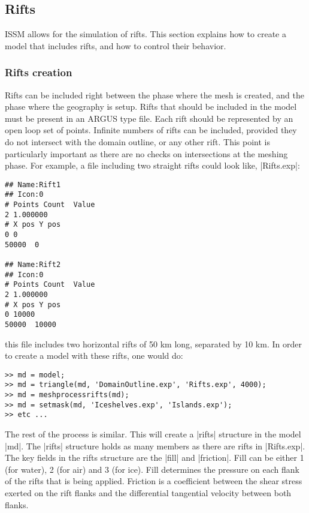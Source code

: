
\subsection{Rifts} \label{sec:using-issm-advanced-rifts}
ISSM allows for the simulation of rifts. This section explains how to create a model that includes rifts, and how to control their behavior.

\subsubsection{Rifts creation}
Rifts can be included right between the phase where the mesh is created, and the phase where the geography is setup. Rifts that should be included in the model must be present in an ARGUS type file. Each rift should be represented by an open loop set of points. Infinite numbers of rifts can be included, provided they do not intersect with the domain outline, or any other rift. This point is particularly important as there are no checks on intersections at the meshing phase. For example, a file including two straight rifts could look like, \lstinlinebg|Rifts.exp|:
\begin{lstlisting}
## Name:Rift1
## Icon:0
# Points Count  Value
2 1.000000
# X pos Y pos
0 0
50000  0

## Name:Rift2
## Icon:0
# Points Count  Value
2 1.000000
# X pos Y pos
0 10000
50000  10000
\end{lstlisting}
this file includes two horizontal rifts of 50 km long, separated by 10 km. In order to create a
model with these rifts, one would do:
\begin{lstlisting}
>> md = model;
>> md = triangle(md, 'DomainOutline.exp', 'Rifts.exp', 4000);
>> md = meshprocessrifts(md);
>> md = setmask(md, 'Iceshelves.exp', 'Islands.exp');
>> etc ...
\end{lstlisting}
The rest of the process is similar. This will create a \lstinlinebg|rifts| structure in the model \lstinlinebg|md|. The \lstinlinebg|rifts| structure holds as many members as there are rifts in \lstinlinebg|Rifts.exp|. The key fields in the rifts structure are the \lstinlinebg|fill| and \lstinlinebg|friction|. Fill can be either 1 (for water), 2 (for air) and 3 (for ice). Fill determines the pressure on each flank of the rifts that is being applied. Friction is a coefficient between the shear stress exerted on the rift flanks and the differential tangential velocity between both flanks.

